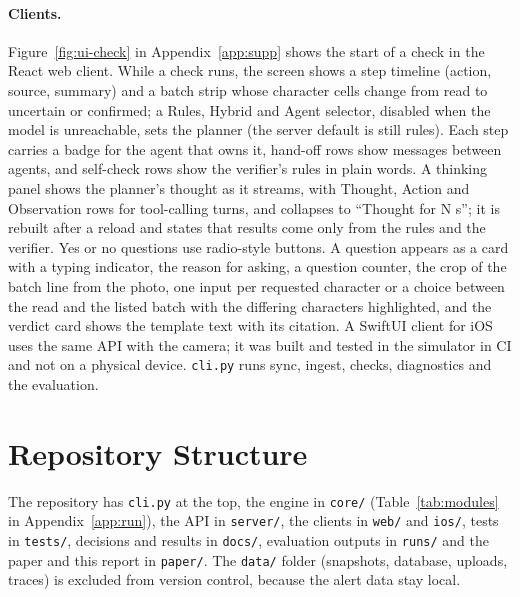 \paragraph{Clients.} Figure~\ref{fig:ui-check} in Appendix~\ref{app:supp} shows the start of a check in the React web client. While a check runs, the screen shows a step timeline (action, source, summary) and a batch strip whose character cells change from read to uncertain or confirmed; a Rules, Hybrid and Agent selector, disabled when the model is unreachable, sets the planner (the server default is still rules). Each step carries a badge for the agent that owns it, hand-off rows show messages between agents, and self-check rows show the verifier's rules in plain words. A thinking panel shows the planner's thought as it streams, with Thought, Action and Observation rows for tool-calling turns, and collapses to ``Thought for N s''; it is rebuilt after a reload and states that results come only from the rules and the verifier. Yes or no questions use radio-style buttons. A question appears as a card with a typing indicator, the reason for asking, a question counter, the crop of the batch line from the photo, one input per requested character or a choice between the read and the listed batch with the differing characters highlighted, and the verdict card shows the template text with its citation. A SwiftUI client for iOS uses the same API with the camera; it was built and tested in the simulator in CI and not on a physical device. \texttt{cli.py} runs sync, ingest, checks, diagnostics and the evaluation.

\section{Repository Structure}
\label{sec:impl-repository-structure}

The repository has \texttt{cli.py} at the top, the engine in \texttt{core/} (Table~\ref{tab:modules} in Appendix~\ref{app:run}), the API in \texttt{server/}, the clients in \texttt{web/} and \texttt{ios/}, tests in \texttt{tests/}, decisions and results in \texttt{docs/}, evaluation outputs in \texttt{runs/} and the paper and this report in \texttt{paper/}. The \texttt{data/} folder (snapshots, database, uploads, traces) is excluded from version control, because the alert data stay local.

\fussy

